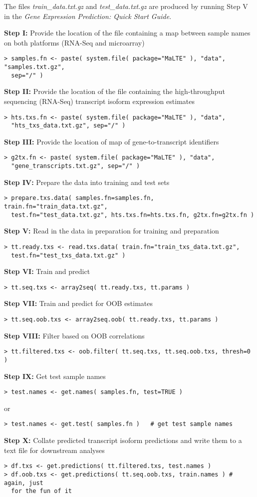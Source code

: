 \documentclass[a4paper,12pt]{article}
\begin{document}
The files \textit{train\_data.txt.gz} and \textit{test\_data.txt.gz} are produced by running Step V in the \textit{Gene Expression Prediction: Quick Start Guide}.

\noindent\textbf{Step I:} Provide the location of the file containing a map between sample names on both platforms (RNA-Seq and microarray)
\begin{verbatim}
> samples.fn <- paste( system.file( package="MaLTE" ), "data", "samples.txt.gz", 
  sep="/" )
\end{verbatim}
\textbf{Step II:} Provide the location of the file containing the high-throughput sequencing (RNA-Seq) transcript isoform expression estimates
\begin{verbatim}
> hts.txs.fn <- paste( system.file( package="MaLTE" ), "data", 
  "hts_txs_data.txt.gz", sep="/" )
\end{verbatim}
\textbf{Step III:} Provide the location of map of gene-to-transcript identifiers
\begin{verbatim}
> g2tx.fn <- paste( system.file( package="MaLTE" ), "data", 
  "gene_transcripts.txt.gz", sep="/" )
\end{verbatim}
\textbf{Step IV:} Prepare the data into training and test sets
\begin{verbatim}
> prepare.txs.data( samples.fn=samples.fn, train.fn="train_data.txt.gz", 
  test.fn="test_data.txt.gz", hts.txs.fn=hts.txs.fn, g2tx.fn=g2tx.fn )
\end{verbatim}
\textbf{Step V:} Read in the data in preparation for training and preparation
\begin{verbatim}
> tt.ready.txs <- read.txs.data( train.fn="train_txs_data.txt.gz", 
  test.fn="test_txs_data.txt.gz" )
\end{verbatim}
\textbf{Step VI:} Train and predict
\begin{verbatim}
> tt.seq.txs <- array2seq( tt.ready.txs, tt.params )
\end{verbatim}
\textbf{Step VII:} Train and predict for OOB estimates
\begin{verbatim}
> tt.seq.oob.txs <- array2seq.oob( tt.ready.txs, tt.params )
\end{verbatim}
\textbf{Step VIII:} Filter based on OOB correlations
\begin{verbatim}
> tt.filtered.txs <- oob.filter( tt.seq.txs, tt.seq.oob.txs, thresh=0 )
\end{verbatim}
\textbf{Step IX:} Get test sample names
\begin{verbatim}
> test.names <- get.names( samples.fn, test=TRUE )
\end{verbatim}
or 
\begin{verbatim}
> test.names <- get.test( samples.fn )   # get test sample names
\end{verbatim}
\textbf{Step X:} Collate predicted transcript isoform predictions and write them to a text file for downstream analyses
\begin{verbatim}
> df.txs <- get.predictions( tt.filtered.txs, test.names )
> df.oob.txs <- get.predictions( tt.seq.oob.txs, train.names ) # again, just 
  for the fun of it
\end{verbatim}
\end{document}
